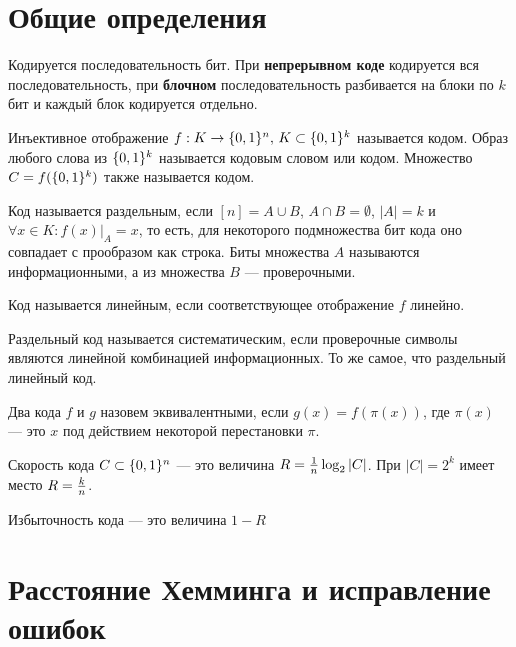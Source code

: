 
\section{Общие определения}
Кодируется последовательность бит. При {\bfseries непрерывном коде} кодируется
вся последовательность, при {\bfseries блочном} последовательность разбивается на
блоки по $k$ бит и каждый блок кодируется отдельно.

\begin{definition}
Инъективное отображение $f: K \to \{0,1\}^n, \, K \subset \{0,1\}^k$ называется кодом. Образ любого слова из $\{0,1\}^k$ 
называется кодовым словом или кодом. Множество $C = f(\{0,1\}^k)$ также называется кодом.
\end{definition}

\begin{definition}
Код называется раздельным, если $[n] = A \cup B$, $A \cap B = \emptyset$, $|A| = k$ и
$\forall x \in K \colon f(x)|_A = x$, то есть, для некоторого подмножества бит
кода оно совпадает с прообразом как строка. Биты множества $A$ называются
информационными, а из множества $B$ --- проверочными.
\end{definition}


\begin{definition}
Код называется линейным, если соответствующее отображение $f$ линейно.
\end{definition}

\begin{definition}
Раздельный код называется систематическим, если проверочные символы являются линейной
комбинацией информационных. То же самое, что раздельный линейный код.
\end{definition}

\begin{definition}
Два кода $f$ и $g$ назовем эквивалентными, если $g(x) = f(\pi(x))$, где $\pi(x)$
--- это $x$ под действием некоторой перестановки $\pi$.
\end{definition}



\begin{definition}
Скорость кода $C \subset \{0,1\}^n$ --- это величина $R = {1 \over n} \log_2 |C|$.
При $|C| = 2^k$ имеет место $R = {k \over n}$.

Избыточность кода --- это величина $1-R$
\end{definition}

\section{Расстояние Хемминга и исправление ошибок}

